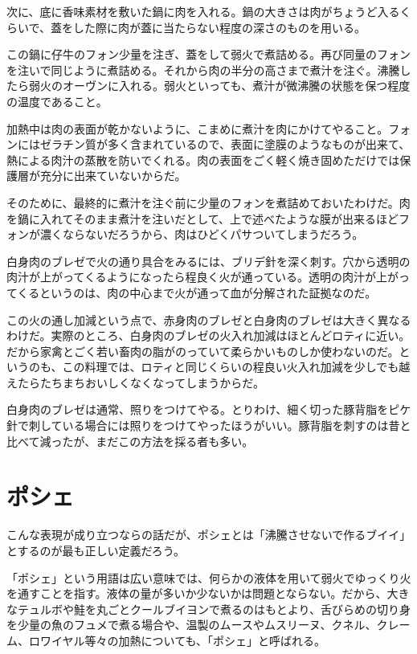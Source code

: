 次に、底に香味素材を敷いた鍋に肉を入れる。鍋の大きさは肉がちょうど入るくらいで、蓋をした際に肉が蓋に当たらない程度の深さのものを用いる。

この鍋に仔牛のフォン少量を注ぎ、蓋をして弱火で煮詰める。再び同量のフォンを注いで同じように煮詰める。それから肉の半分の高さまで煮汁を注ぐ。沸騰したら弱火のオーヴンに入れる。弱火といっても、煮汁が微沸騰の状態を保つ程度の温度であること。

加熱中は肉の表面が乾かないように、こまめに煮汁を肉にかけてやること。フォンにはゼラチン質が多く含まれているので、表面に塗膜のようなものが出来て、熱による肉汁の蒸散を防いでくれる。肉の表面をごく軽く焼き固めただけでは保護層が充分に出来ていないからだ。

そのために、最終的に煮汁を注ぐ前に少量のフォンを煮詰めておいたわけだ。肉を鍋に入れてそのまま煮汁を注いだとして、上で述べたような膜が出来るほどフォンが濃くならないだろうから、肉はひどくパサついてしまうだろう。

白身肉のブレゼで火の通り具合をみるには、ブリデ針を深く刺す。穴から透明の肉汁が上がってくるようになったら程良く火が通っている。透明の肉汁が上がってくるというのは、肉の中心まで火が通って血が分解された証拠なのだ。

この火の通し加減という点で、赤身肉のブレゼと白身肉のブレゼは大きく異なるわけだ。実際のところ、白身肉のブレゼの火入れ加減はほとんどロティに近い。だから家禽とごく若い畜肉の脂がのっていて柔らかいものしか使わないのだ。というのも、この料理では、ロティと同じくらいの程良い火入れ加減を少しでも越えたらたちまちおいしくなくなってしまうからだ。

白身肉のブレゼは通常、照りをつけてやる。とりわけ、細く切った豚背脂をピケ針で刺している場合には照りをつけてやったほうがいい。豚背脂を刺すのは昔と比べて減ったが、まだこの方法を採る者も多い。

\hypertarget{les-poches}{%
\section{ポシェ}\label{les-poches}}

こんな表現が成り立つならの話だが、ポシェとは「沸騰させないで作るブイイ」とするのが最も正しい定義だろう。

「ポシェ」という用語は広い意味では、何らかの液体を用いて弱火でゆっくり火を通すことを指す。液体の量が多いか少ないかは問題とならない。だから、大きなテュルボや鮭を丸ごとクールブイヨンで煮るのはもとより、舌びらめの切り身を少量の魚のフュメで煮る場合や、温製のムースやムスリーヌ、クネル、クレーム、ロワイヤル等々の加熱についても、「ポシェ」と呼ばれる。

